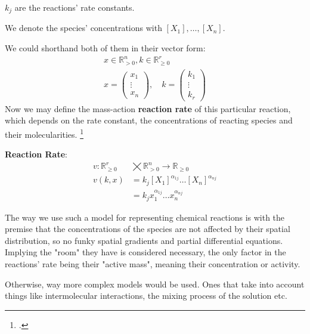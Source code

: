 $k_j$ are the reactions' rate constants.

We denote the species' concentrations with $[X_1], \dots, [X_n]$.

We could shorthand both of them in their vector form:
\begin{gather*}
	x \in \mathbb{R}^n_{> 0},  k \in \mathbb{R}^r_{\geq 0} \\
	x =
	\begin{pmatrix}
		x_1 \\
		\vdots \\
		x_n 	
	\end{pmatrix}, \quad k =
	\begin{pmatrix*}
		k_1  \\
		\vdots \\
		k_r	
	\end{pmatrix*}
\end{gather*}
Now we may define the mass-action \textbf{reaction rate} of this particular reaction, which depends on the rate constant, the concentrations of reacting species and their molecularities.
\footcite{Derbez2015,Lorand2024}
\begin{definition}
	\textbf{Reaction Rate}:	
	\begin{align}\label{reaction_rate}
		v : \mathbb{R}^r_{\geq 0}  &\bigtimes \mathbb{R}^n_{> 0} \rightarrow \mathbb{R}_{\geq 0}  \nonumber \\
		v(k,x) &= k_j [X_1]^{\alpha_{1j}} \dots [X_n]^{\alpha_{nj}} \\
		&= k_j x_1^{\alpha_{1j}} \dots x_n^{\alpha_{nj}} \nonumber
	\end{align}
\end{definition}

The way we use such a model for representing chemical reactions is with the premise that the concentrations of the species are not affected by their spatial distribution, so no funky spatial gradients and partial differential equations. Implying the "room" they have is considered necessary, the only factor in the reactions' rate being their "active mass", meaning their concentration or activity.

Otherwise, way more complex models would be used. Ones that take into account things like intermolecular interactions, the mixing process of the solution etc.

